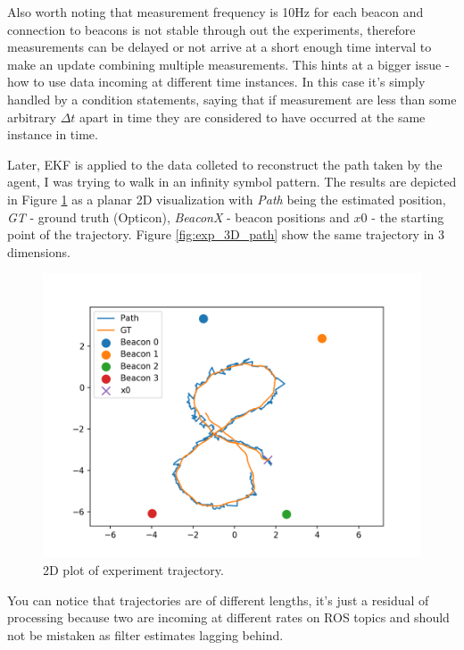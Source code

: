 Also worth noting that measurement frequency is 10Hz for each beacon and connection to beacons is not stable through out the experiments, therefore measurements can be delayed or not arrive at a short enough time interval to make an update combining multiple measurements. This hints at a bigger issue - how to use data incoming at different time instances. In this case it's simply handled by a condition statements, saying that if measurement are less than some arbitrary $\Delta t$ apart in time they are considered to have occurred at the same instance in time.

Later, EKF is applied to the data colleted to reconstruct the path taken by the agent, I was trying to walk in an infinity symbol pattern. The results are depicted in Figure \ref{fig:exp_2d_path} as a planar 2D visualization with \emph{Path} being the estimated position, \emph{GT} - ground truth (Opticon), \emph{BeaconX} - beacon positions and \emph{$x0$} - the starting point of the trajectory. Figure \ref{fig:exp_3D_path} show the same trajectory in 3 dimensions.
\begin{figure}[H]
    \centering
    \includegraphics[width=\linewidth]{figures/2d_path.png}
    \caption{2D plot of experiment trajectory.}
    \label{fig:exp_2d_path}
\end{figure}

You can notice that trajectories are of different lengths, it's just a residual of processing because two are incoming at different rates on ROS topics and should not be mistaken as filter estimates lagging behind.

